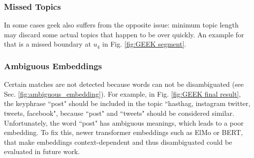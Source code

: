     \subsubsection{Missed Topics}
        In some cases \gls{geek} also suffers from the opposite issue: minimum topic length may discard some actual topics that happen to be over quickly. An example for that is a missed boundary at $u_4$ in Fig. \ref{fig:GEEK segment}.

    \subsubsection{Ambiguous Embeddings}
        Certain matches are not detected because words can not be disambiguated (see Sec. \ref{fig:ambiguous_embedding}). For example, in Fig. \ref{fig:GEEK final result}, the \gls{keyphrase} ``post" should be included in the topic ``hasthag, instagram twitter, tweets, facebook", because ``post" and ``tweets" should be considered similar. Unfortunately, the word ``post" has ambiguous meanings, which leads to a poor embedding. To fix this, newer transformer \glspl{embedding} such as ElMo\cite{peters2018elmo} or BERT\cite{devlin2018bert}, that make \glspl{embedding} context-dependent and thus disambiguated could be evaluated in future work. \newline
